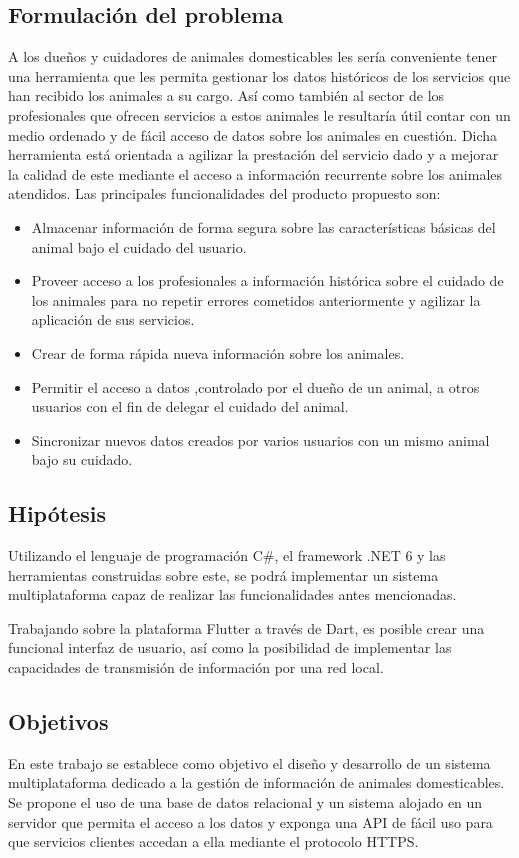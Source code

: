 \subsection*{Formulaci\'on del problema}
A los dueños y cuidadores de animales domesticables les sería conveniente tener una herramienta que les permita gestionar los datos históricos de los servicios que han recibido los animales a su cargo. Así como también al sector de los profesionales que ofrecen servicios a estos animales le resultaría útil contar con un medio ordenado y de fácil acceso de datos sobre los animales en cuestión. Dicha herramienta está orientada a agilizar la prestación del servicio dado y a mejorar la calidad de este mediante el acceso a información recurrente sobre los animales atendidos. Las principales funcionalidades del producto propuesto son:
\begin{itemize}
\item Almacenar información de forma segura sobre las características básicas del animal bajo el cuidado del usuario.
\item Proveer acceso a los profesionales a información histórica sobre el cuidado de los animales para no repetir errores cometidos anteriormente y agilizar la aplicación de sus servicios.
\item Crear de forma rápida nueva información sobre los animales.
\item Permitir el acceso a datos ,controlado por el dueño de un animal, a otros usuarios con el fin de delegar el cuidado del animal.
\item Sincronizar nuevos datos creados por varios usuarios con un mismo animal bajo su cuidado.
\end{itemize}
\subsection*{Hip\'otesis}
Utilizando el lenguaje de programación C\#, el framework  .NET 6 y las herramientas construidas sobre este, se podrá implementar un sistema multiplataforma capaz de realizar las funcionalidades antes mencionadas.

Trabajando sobre la plataforma Flutter a trav\'es de Dart, es posible crear una funcional interfaz de usuario, as\'i como la posibilidad de implementar las capacidades de transmisi\'on de informaci\'on por una red local.
\subsection*{Objetivos}
En este trabajo se establece como objetivo el diseño y desarrollo de un sistema multiplataforma dedicado a la gestión de información de animales domesticables. Se propone el uso de una base de datos relacional y un sistema alojado en un servidor que permita el acceso a los datos y exponga una API de fácil uso para que servicios clientes accedan a ella mediante el protocolo HTTPS.
